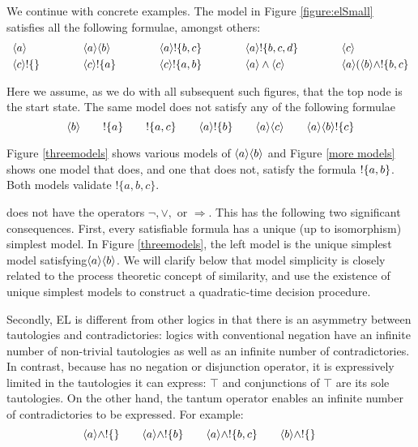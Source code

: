 We continue with concrete examples.  The model in Figure
\ref{figure:elSmall} satisfies all the following formulae, amongst
others:
\[
\begin{array}{lclclclcl}
\MAY{a} &\qquad&
\MAY{a} \MAY{b} &\qquad&
\MAY{a} \fBang \{b,c\} &\qquad&
\MAY{a} \fBang \{b,c,d\} &\qquad&
\MAY{c} \\[1mm]
\MAY{c} \fBang \{\} &&
\MAY{c} \fBang \{a\} &&
\MAY{c} \fBang \{a,b\} &&
\MAY{a} \land \MAY{c} &&
\MAY{a} (\MAY{b} \land \fBang \{b,c\}
\end{array}
\]

\NI Here we assume, as we do with all subsequent such figures, that
the top node is the start state.  The same model does not satisfy any
of the following formulae
\[
\langle b \rangle \qquad
! \{a\} \qquad
! \{a, c\} \qquad
\langle a \rangle ! \{b\} \qquad
\langle a \rangle \langle c \rangle \qquad
\langle a \rangle \langle b \rangle ! \{c\} 
\]

\NI Figure \ref{threemodels} shows various models of $\MAY{a} \MAY{b}$
and Figure \ref{more models} shows one model that does, and one that
does not, satisfy the formula $! \{a,b\}$.  Both models validate
$!\{a, b, c\}$.

\Cathoristic{} does not have the operators $\neg, \lor, $ or
$\Rightarrow$.  This has the following two significant consequences.
First, every satisfiable formula has a unique (up to isomorphism)
simplest model.  In Figure \ref{threemodels}, the left model is the
unique simplest model satisfying$\MAY{a} \MAY{b}$.  We will clarify
below that model simplicity is closely related to the process
theoretic concept of similarity, and use the existence of unique
simplest models to construct a quadratic-time decision procedure.





Secondly, EL is different from other logics in that there is an
asymmetry between tautologies and contradictories: logics with
conventional negation have an infinite number of non-trivial
tautologies as well as an infinite number of contradictories.  In
contrast, because \cathoristic{} has no negation or disjunction
operator, it is expressively limited in the tautologies it can
express: $\top$ and conjunctions of $\top$ are its sole tautologies. On the
other hand, the tantum operator enables an infinite number of
contradictories to be expressed.  For example:
\[
   \langle a \rangle \land ! \{\} \qquad
   \langle a \rangle \land ! \{b\} \qquad
   \langle a \rangle \land ! \{b, c\} \qquad
   \langle b \rangle \land ! \{\} \qquad
\]


